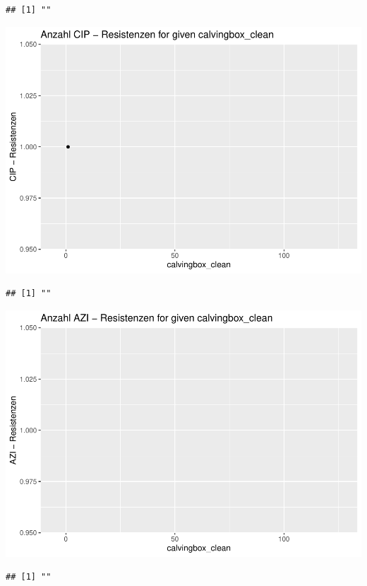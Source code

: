 \documentclass[
]{article}
\begin{document}
\begin{verbatim}
## [1] ""
\end{verbatim}

\includegraphics{NResistenzen_files/figure-latex/numerical_variables-22.pdf}

\begin{verbatim}
## [1] ""
\end{verbatim}

\includegraphics{NResistenzen_files/figure-latex/numerical_variables-23.pdf}

\begin{verbatim}
## [1] ""
\end{verbatim}
\end{document}
